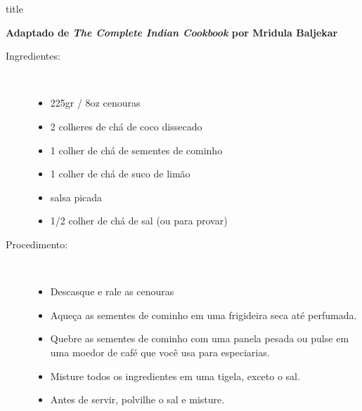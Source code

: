 \documentclass [11pt, letterpaper] {article}
\begin{document}
 {title}

\begin {flushright}
{\bf Adaptado de {\it The Complete Indian Cookbook} por Mridula Baljekar}
\end {flushright}


\vspace {0.3in}
\begin {description}

\item [Ingredientes:] \ \\
\begin {itemize}
\item 225gr / 8oz cenouras
\item 2 colheres de chá de coco dissecado
\item 1 colher de chá de sementes de cominho
\item 1 colher de chá de suco de limão
\item salsa picada
\item 1/2 colher de chá de sal (ou para provar)
\end {itemize}

\item [Procedimento:] \ \\
\begin {itemize}
\item Descasque e rale as cenouras
\item Aque\c{c}a as sementes de cominho em uma frigideira seca até perfumada.
\item Quebre as sementes de cominho com uma panela pesada ou pulse em uma moedor de café que voc\^e usa para especiarias.
\item Misture todos os ingredientes em uma tigela, exceto o sal.
\item Antes de servir, polvilhe o sal e misture.
\end {itemize}

\end {description}
\end{document}
